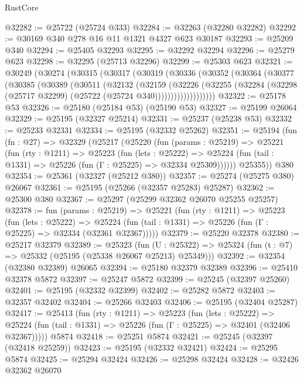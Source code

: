 \begin{lexlean}{RustCore}
\begin{coremodule}
@32282 := @25722 (@25724 @333)
@32284 := @32263 (@32280 @32282)
@32292 := @30169 @340 @278 @16 @11 @1321 @4327 @623 @30187
@32293 := @25209 @340
@32294 := @25405 @32293
@32295 := @32292 @32294
@32296 := @25279 @623
@32298 := @32295 (@25713 @32296)
@32299 := @25303 @623
@32321 := @30249
    (@30274
      (@30315
        (@30317
          (@30319
            (@30336
              (@30352
                (@30364
                  (@30377
                    (@30385
                      (@30389
                        (@30511
                          (@32132
                            (@32159
                              (@32226
                                (@32255
                                  (@32284
                                    (@32298 (@25717 @32299) (@25722 (@25724 @340)))))))))))))))))))
@32322 := @25178 @53
@32326 := @25180 (@25184 @53) (@25190 @53)
@32327 := @25199 @26064
@32329 := @25195 (@32327 @25214)
@32331 := @25237 (@25238 @53)
@32332 := @25233 @32331
@32334 := @25195 (@32332 @25262)
@32351 := @25194
    (fun (fn : @27) =>
    @32329
      (@25217
        (@25220
          (fun (params : @25219) =>
          @25221
            (fun (rty : @1211) =>
            @25223
              (fun (lets : @25222) =>
              @25224 (fun (tail : @1331) => @25226 (fun (Γ : @25225) => @32334 @25309))))))
        @25355))
    @380
@32354 := @25361 (@32327 (@25212 @380))
@32357 := @25274 (@25275 @380) @26067
@32361 := @25195 (@25266 (@32357 @25283) @25287)
@32362 := @25300 @380
@32367 := @25297 (@25299 @32362 @26070 @25255 @25257)
@32378 := fun (params : @25219) =>
  @25221
    (fun (rty : @1211) =>
    @25223
      (fun (lets : @25222) =>
      @25224 (fun (tail : @1331) => @25226 (fun (Γ : @25225) => @32334 (@32361 @32367)))))
@32379 := @25220 @32378
@32380 := @25217 @32379
@32389 := @25323
    (fun (U : @25322) => @25324 (fun (t : @7) => @25332 (@25195 (@25338 @26067 @25213) @25349)))
@32392 := @32354 (@32380 @32389) @26065
@32394 := @25180 @32379 @32389
@32396 := @25410 @32378 @5872
@32397 := @25247 @5872
@32399 := @25245 (@32397 @25260)
@32401 := @25195 (@32332 @32399)
@32402 := @25282 @5872
@32403 := @32357 @32402
@32404 := @25266 @32403
@32406 := @25195 (@32404 @25287)
@32417 := @25413
    (fun (rty : @1211) =>
    @25223
      (fun (lets : @25222) =>
      @25224 (fun (tail : @1331) => @25226 (fun (Γ : @25225) => @32401 (@32406 @32367)))))
    @5874
@32418 := @25251 @5874
@32421 := @25245 (@32397 (@32418 @25259))
@32423 := @25195 (@32332 @32421)
@32424 := @25295 @5874
@32425 := @25294 @32424
@32426 := @25298 @32424
@32428 := @32426 @32362 @26070

\end{coremodule}
\end{lexlean}
